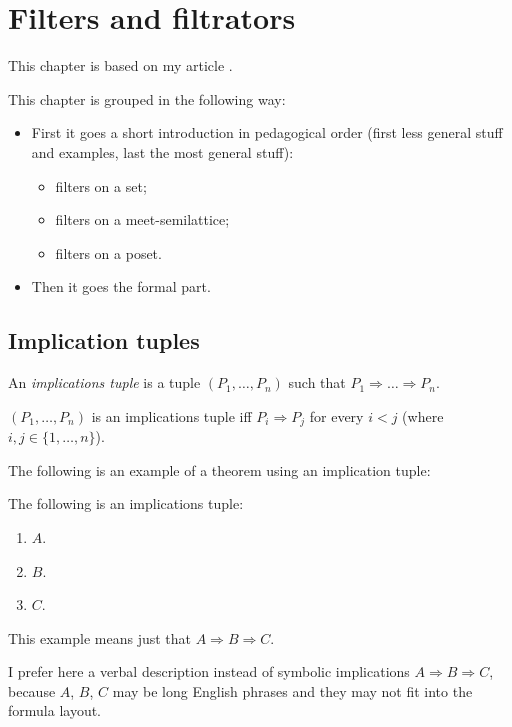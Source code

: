 
\chapter{\label{chap-filt}Filters and filtrators}

This chapter is based on my article \cite{filters}.

This chapter is grouped in the following way:
\begin{itemize}
\item First it goes a short introduction in pedagogical order (first less
general stuff and examples, last the most general stuff):

\begin{itemize}
\item filters on a set;
\item filters on a meet-semilattice;
\item filters on a poset.
\end{itemize}
\item Then it goes the formal part.
\end{itemize}

\section{Implication tuples}
\begin{defn}
An \emph{implications tuple} is a tuple $(P_{1},\ldots,P_{n})$ such
that $P_{1}\Rightarrow\ldots\Rightarrow P_{n}$.\end{defn}
\begin{obvious}
$(P_{1},\ldots,P_{n})$ is an implications tuple iff $P_{i}\Rightarrow P_{j}$
for every $i<j$ (where $i,j\in\{1,\ldots,n\}$).
\end{obvious}
The following is an example of a theorem using an implication tuple:
\begin{example}
The following is an implications tuple:
\begin{enumerate}
\item $A$.
\item $B$.
\item $C$.
\end{enumerate}
\end{example}
This example means just that $A\Rightarrow B\Rightarrow C$.

I prefer here a verbal description instead of symbolic implications
$A\Rightarrow B\Rightarrow C$, because $A$, $B$, $C$ may be long
English phrases and they may not fit into the formula layout.

